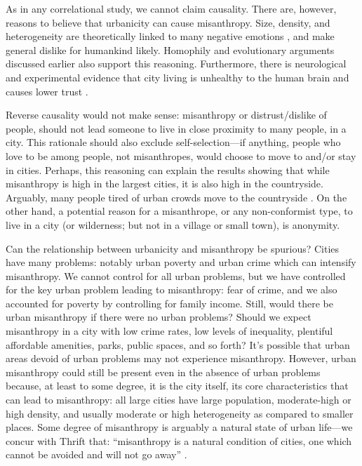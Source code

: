\documentclass[11pt, letterpaper]{article}
\begin{document}
\begin{spacing}{1.4}
As in any correlational study, we cannot claim causality. There are, however,
reasons to believe that urbanicity can cause misanthropy. Size, density, and
heterogeneity are theoretically linked to many negative emotions
\citep{wirth38}, and make general dislike for humankind likely. Homophily and
evolutionary arguments discussed earlier also support this reasoning. {Furthermore, there is neurological and experimental evidence that city living is unhealthy to the human brain \citep{lederbogen11} and causes lower trust \citep{milgram70}.}

Reverse causality would not make sense: misanthropy or distrust/dislike of people, should
not lead someone to live in close proximity to many people, in a city. This rationale should also exclude self-selection---if anything, people who
 love to be among  people, not misanthropes, would choose to move to and/or stay in cities. Perhaps, this reasoning can explain the results showing that while misanthropy is high in the largest
cities, it is also high in the countryside. Arguably, many people tired of urban crowds move to the countryside \citep[e.g.,][]{deweyWP17nov23}.
%
On the other hand, a potential reason for a misanthrope, or any  non-conformist type, to live in a city (or wilderness; but not in a village or small town), is anonymity.

Can the relationship between urbanicity and misanthropy be spurious? Cities have many problems: notably urban poverty and urban crime which can intensify misanthropy. We cannot control for all urban problems, but we have
controlled for the key urban problem leading to misanthropy: fear of crime, and we also accounted for poverty by controlling for family income. 
Still, would there be urban misanthropy if there were no urban problems? Should we expect misanthropy in a city with low crime rates, low levels of inequality, plentiful affordable amenities, parks, public spaces, and so forth? It's possible that urban areas devoid of urban problems may not experience misanthropy. However, urban misanthropy could still be present even in the absence of urban problems because, at least to some degree, it is the city itself, its core characteristics that can lead to misanthropy: all large cities have large population, moderate-high or high density, and usually moderate or high heterogeneity as compared to smaller
places. Some degree of misanthropy is arguably a natural state of urban life---we concur with Thrift that: ``misanthropy is a natural condition of cities, one which cannot be avoided and will not go away'' \citep{thrift05}.
%


\end{spacing}
\end{document}
